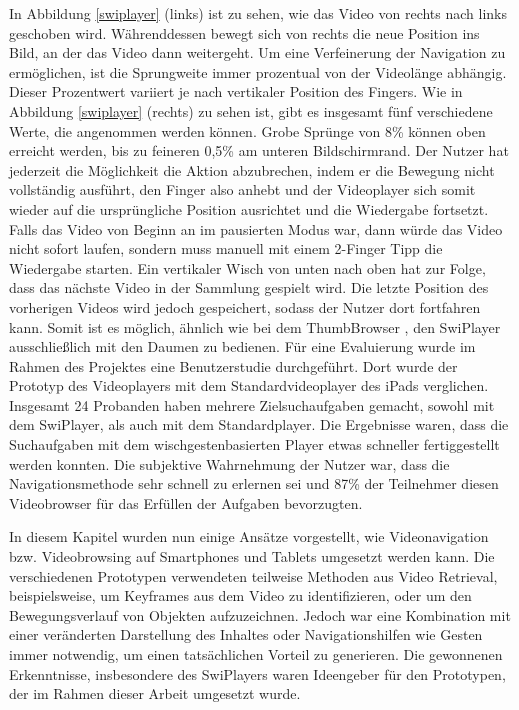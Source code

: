 \documentclass[11pt,a4paper]{report}
\begin{document}
In Abbildung \ref{swiplayer} (links) ist zu sehen, wie das Video von rechts nach links geschoben wird. Währenddessen bewegt sich von rechts die neue Position ins Bild, an der das Video dann weitergeht. Um eine Verfeinerung der Navigation zu ermöglichen, ist die Sprungweite immer prozentual von der Videolänge abhängig. Dieser Prozentwert variiert je nach vertikaler Position des Fingers. Wie in Abbildung \ref{swiplayer} (rechts) zu sehen ist, gibt es insgesamt fünf verschiedene Werte, die angenommen werden können. Grobe Sprünge von 8\% können oben erreicht werden, bis zu feineren 0,5\% am unteren Bildschirmrand. Der Nutzer hat jederzeit die Möglichkeit die Aktion abzubrechen, indem er die Bewegung nicht vollständig ausführt, den Finger also anhebt und der Videoplayer sich somit wieder auf die ursprüngliche Position ausrichtet und die Wiedergabe fortsetzt. Falls das Video von Beginn an im pausierten Modus war, dann würde das Video nicht sofort laufen, sondern muss manuell mit einem 2-Finger Tipp die Wiedergabe starten. Ein vertikaler Wisch von unten nach oben hat zur Folge, dass das nächste Video in der Sammlung gespielt wird. Die letzte Position des vorherigen Videos wird jedoch gespeichert, sodass der Nutzer dort fortfahren kann. Somit ist es möglich, ähnlich wie bei dem ThumbBrowser \cite{hudelist2013mobile}, den SwiPlayer ausschließlich mit den Daumen zu bedienen. Für eine Evaluierung wurde im Rahmen des Projektes eine Benutzerstudie durchgeführt. Dort wurde der Prototyp des Videoplayers mit dem Standardvideoplayer des iPads verglichen. Insgesamt 24 Probanden haben mehrere Zielsuchaufgaben gemacht, sowohl mit dem SwiPlayer, als auch mit dem Standardplayer. Die Ergebnisse waren, dass die Suchaufgaben mit dem wischgestenbasierten Player etwas schneller fertiggestellt werden konnten. Die subjektive Wahrnehmung der Nutzer war, dass die Navigationsmethode sehr schnell zu erlernen sei und 87\% der Teilnehmer diesen Videobrowser für das Erfüllen der Aufgaben bevorzugten.

In diesem Kapitel wurden nun einige Ansätze vorgestellt, wie Videonavigation bzw. Videobrowsing auf Smartphones und Tablets umgesetzt werden kann. Die verschiedenen Prototypen verwendeten teilweise Methoden aus Video Retrieval, beispielsweise, um Keyframes aus dem Video zu identifizieren, oder um den Bewegungsverlauf von Objekten aufzuzeichnen. Jedoch war eine Kombination mit einer veränderten Darstellung des Inhaltes oder Navigationshilfen wie Gesten immer notwendig, um einen tatsächlichen Vorteil zu generieren. Die gewonnenen Erkenntnisse, insbesondere des SwiPlayers waren Ideengeber für den Prototypen, der im Rahmen dieser Arbeit umgesetzt wurde.
\end{document}
